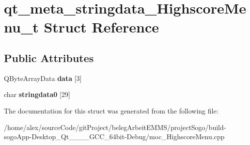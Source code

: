 \hypertarget{structqt__meta__stringdata__HighscoreMenu__t}{\section{qt\-\_\-meta\-\_\-stringdata\-\_\-\-Highscore\-Menu\-\_\-t Struct Reference}
\label{structqt__meta__stringdata__HighscoreMenu__t}
}
\subsection*{Public Attributes}
\begin{DoxyCompactItemize}
\item 
\hypertarget{structqt__meta__stringdata__HighscoreMenu__t_a2ca5f3fa9dc8d45f0b104d57e239c3dd}{Q\-Byte\-Array\-Data {\bfseries data} \mbox{[}3\mbox{]}}\label{structqt__meta__stringdata__HighscoreMenu__t_a2ca5f3fa9dc8d45f0b104d57e239c3dd}

\item 
\hypertarget{structqt__meta__stringdata__HighscoreMenu__t_a6c8664bacd0e5702131151b5ba828e7c}{char {\bfseries stringdata0} \mbox{[}29\mbox{]}}\label{structqt__meta__stringdata__HighscoreMenu__t_a6c8664bacd0e5702131151b5ba828e7c}

\end{DoxyCompactItemize}


The documentation for this struct was generated from the following file\-:\begin{DoxyCompactItemize}
\item 
/home/alex/source\-Code/git\-Project/beleg\-Arbeit\-E\-M\-M\-S/project\-Sogo/build-\/sogo\-App-\/\-Desktop\-\_\-\-Qt\-\_\-\_\-\_\-\_\-\-G\-C\-C\-\_\-64bit-\/\-Debug/moc\-\_\-\-Highscore\-Menu.\-cpp\end{DoxyCompactItemize}
